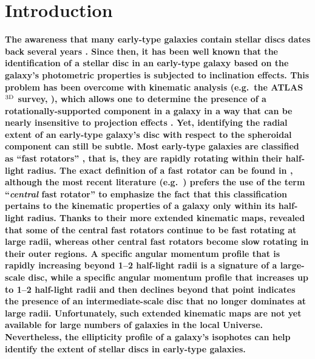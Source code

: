 \documentclass[useAMS,usenatbib,article]{mnras}
\begin{document}
\section{Introduction}
\label{sec:int}
{\bf The awareness that many early-type galaxies contain stellar discs dates back several years 
\citep{michard1984,djorgovski1985,carter1987,capaccioli1987,bender1988,bender1990,capaccioli1988,franx1989,
nieto1988,nieto1991,rixwhite1990,rixwhite1992,vandenbergh1990,scorzabender1990,scorzabender1995,
simienmichard1990,cinzanovandermarel1993,donofrio1995,graham1998fornax,scorza1998,scorzavandenbosch1998,bendersaglia1999}. 
Since then, it has been well known that 
the identification of a stellar disc in an early-type galaxy based on the galaxy's photometric properties 
is subjected to inclination effects. 
This problem has been overcome with kinematic analysis (e.g.~the ATLAS$^{\rm 3D}$ survey, \citealt{cappellari2011}), 
which allows one to determine the presence of a rotationally-supported component in a galaxy 
in a way that can be nearly insensitive to projection effects \citep{cappellari2007,emsellem2007}. 
Yet, identifying the radial extent of an early-type galaxy's disc with respect to the spheroidal component can still be subtle. 
Most early-type galaxies are classified as ``fast rotators'' \citep{atlas3dIII,scott2014}, 
that is, they are rapidly rotating within their half-light radius. 
The exact definition of a fast rotator can be found in \cite{emsellem2007}, 
although the most recent literature (e.g.~\citealt{arnold2011n3115,romanowskyfall2012,arnold2014}) 
prefers the use of the term ``\emph{central} fast rotator'' 
to emphasize the fact that this classification pertains to the kinematic properties of a galaxy only within its half-light radius.
Thanks to their more extended kinematic maps, 
\cite{arnold2014} revealed that some of the central fast rotators continue to be fast rotating at large radii, 
whereas other central fast rotators become slow rotating in their outer regions.
A specific angular momentum profile that is rapidly increasing beyond 1--2 half-light radii 
is a signature of a large-scale disc, 
while a specific angular momentum profile that increases up to 1--2 half-light radii and then declines beyond that point 
indicates the presence of an intermediate-scale disc that no longer dominates at large radii. 
Unfortunately, such extended kinematic maps are not yet available for large numbers of galaxies in the local Universe. 
Nevertheless, the ellipticity profile of a galaxy's isophotes can help identify the extent of stellar discs in early-type galaxies. \\
}
\end{document}
